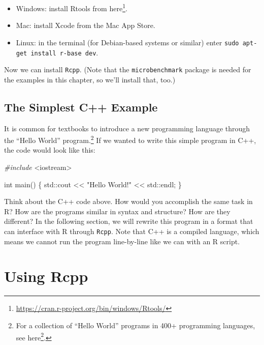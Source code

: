 \documentclass[
]{krantz}
\makeatletter
\newenvironment{Shaded}{\begin{snugshade}}{\end{snugshade}}
\newcommand{\BuiltInTok}[1]{#1}
\newcommand{\DataTypeTok}[1]{\textcolor[rgb]{0.27,0.27,0.27}{#1}}
\newcommand{\ImportTok}[1]{#1}
\newcommand{\NormalTok}[1]{#1}
\newcommand{\PreprocessorTok}[1]{\textcolor[rgb]{0.37,0.37,0.37}{\textit{#1}}}
\newcommand{\StringTok}[1]{\textcolor[rgb]{0.5,0.5,0.5}{#1}}
\providecommand{\tightlist}{%
  \setlength{\itemsep}{0pt}\setlength{\parskip}{0pt}}
\renewcommand{\href}[2]{#2\footnote{\url{#1}}}
\newenvironment{kframe}{%
\medskip{}
\setlength{\fboxsep}{.8em}
 \def\at@end@of@kframe{}%
 \ifinner\ifhmode%
  \def\at@end@of@kframe{\end{minipage}}%
  \begin{minipage}{\columnwidth}%
 \fi\fi%
 \def\FrameCommand##1{\hskip\@totalleftmargin \hskip-\fboxsep
 \colorbox{shadecolor}{##1}\hskip-\fboxsep
     \hskip-\linewidth \hskip-\@totalleftmargin \hskip\columnwidth}%
 \MakeFramed {\advance\hsize-\width
   \@totalleftmargin\z@ \linewidth\hsize
   \@setminipage}}%
 {\par\unskip\endMakeFramed%
 \at@end@of@kframe}
\renewenvironment{Shaded}{\begin{kframe}}{\end{kframe}}
\makeatother
\begin{document}
\begin{itemize}
\tightlist
\item
  Windows: install Rtools from \href{https://cran.r-project.org/bin/windows/Rtools/}{here}.
\item
  Mac: install Xcode from the Mac App Store.
\item
  Linux: in the terminal (for Debian-based systems or similar) enter
  \texttt{sudo\ apt-get\ install\ r-base\ dev}.
\end{itemize}

Now we can install \texttt{Rcpp}. (Note that the \texttt{microbenchmark} package is needed for the examples in this chapter, so we'll install that, too.)

\hypertarget{the-simplest-c-example}{%
\subsection{The Simplest C++ Example}\label{the-simplest-c-example}}

It is common for textbooks to introduce a new programming language through the ``Hello World'' program.\footnote{For a collection of ``Hello World'' programs in 400+ programming languages, see \href{https://helloworldcollection.github.io/}{here}.} If we wanted to write this simple program in C++, the code would look like this:

\begin{Shaded}
\begin{Highlighting}[]
\PreprocessorTok{\#include }\ImportTok{\textless{}iostream\textgreater{}}

\DataTypeTok{int}\NormalTok{ main()}
\NormalTok{\{}
    \BuiltInTok{std::}\NormalTok{cout \textless{}\textless{} }\StringTok{"Hello World!"}\NormalTok{ \textless{}\textless{} }\BuiltInTok{std::}\NormalTok{endl;}
\NormalTok{\}}
\end{Highlighting}
\end{Shaded}

Think about the C++ code above. How would you accomplish the same task in R? How are the programs similar in syntax and structure? How are they different? In the following section, we will rewrite this program in a format that can interface with R through \texttt{Rcpp}. Note that C++ is a compiled language, which means we cannot run the program line-by-line like we can with an R script.

\hypertarget{using-rcpp}{%
\section{Using Rcpp}\label{using-rcpp}}
\end{document}
